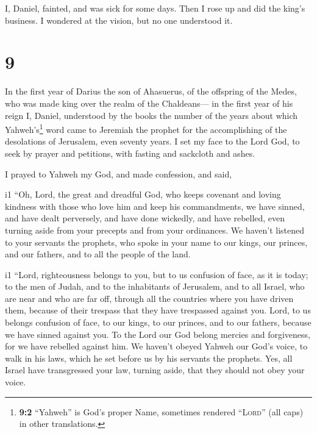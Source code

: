  I, Daniel, fainted, and was sick for some days. Then I
rose up and did the king's business. I wondered at the vision, but no
one understood it.

\hypertarget{section-8}{%
\section{9}\label{section-8}}

 In the first year of Darius the son of Ahasuerus, of the
offspring of the Medes, who was made king over the realm of the
Chaldeans---  in the first year of his reign I, Daniel,
understood by the books the number of the years about which
Yahweh's\footnote{\textbf{9:2} ``Yahweh'' is God's proper Name,
  sometimes rendered ``\textsc{Lord}'' (all caps) in other translations.}
word came to Jeremiah the prophet for the accomplishing of the
desolations of Jerusalem, even seventy years.  I set my
face to the Lord God, to seek by prayer and petitions, with fasting and
sackcloth and ashes.

 I prayed to Yahweh my God, and made confession, and said,

i1 ``Oh, Lord, the great and dreadful God, who keeps covenant and loving
kindness with those who love him and keep his commandments,
 we have sinned, and have dealt perversely, and have done
wickedly, and have rebelled, even turning aside from your precepts and
from your ordinances.  We haven't listened to your
servants the prophets, who spoke in your name to our kings, our princes,
and our fathers, and to all the people of the land.

i1  ``Lord, righteousness belongs to you, but to us
confusion of face, as it is today; to the men of Judah, and to the
inhabitants of Jerusalem, and to all Israel, who are near and who are
far off, through all the countries where you have driven them, because
of their trespass that they have trespassed against you. 
Lord, to us belongs confusion of face, to our kings, to our princes, and
to our fathers, because we have sinned against you.  To
the Lord our God belong mercies and forgiveness, for we have rebelled
against him.  We haven't obeyed Yahweh our God's voice,
to walk in his laws, which he set before us by his servants the
prophets.  Yes, all Israel have transgressed your law,
turning aside, that they should not obey your voice.

